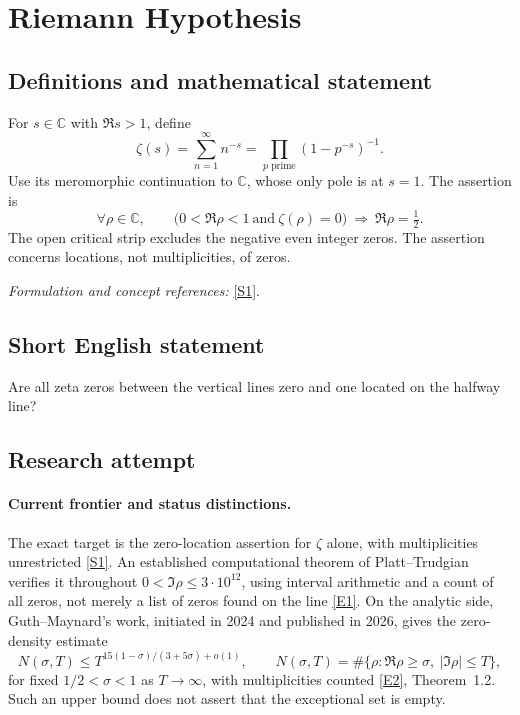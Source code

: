 \documentclass[11pt]{article}
\newcommand{\C}{\mathbb{C}}
\newcommand{\sref}[2]{\hyperlink{source:#1:#2}{[S#2]}}
\newcommand{\eref}[2]{\hyperlink{extra:#1:#2}{[E#2]}}
\newif\ifshowcatalogue
\newcommand{\cataloguescope}[1]{\ifshowcatalogue
 \paragraph{Exact scope in the supplied catalogue.}
 \begin{quote}\small #1\end{quote}\fi}
\begin{document}
\setcounter{section}{1}
\clearpage
\section{\texorpdfstring{Riemann Hypothesis}{Riemann Hypothesis}}\label{2}
\subsection{Definitions and mathematical statement}
For $s\in\C$ with $\Re s>1$, define
\[
 \zeta(s)=\sum_{n=1}^{\infty}n^{-s}=\prod_{p\text{ prime}}(1-p^{-s})^{-1}.
\]
Use its meromorphic continuation to $\C$, whose only pole is at $s=1$. The assertion is
\[
 \forall\rho\in\C,\qquad \bigl(0<\Re\rho<1\ \text{and}\ \zeta(\rho)=0\bigr)
 \ \Longrightarrow\ \Re\rho=\tfrac12.
\]
The open critical strip excludes the negative even integer zeros. The assertion concerns locations, not multiplicities, of zeros.
\par\smallskip\textit{Formulation and concept references:} \sref{2}{1}.
\cataloguescope{For the meromorphic continuation of the Riemann zeta function zeta(s)=sum\_\{n>=1\} n\textasciicircum{}(-s), initially defined for Re(s)>1, every zero s in the open critical strip 0<Re(s)<1 has Re(s)=1/2. This is the Riemann Hypothesis for zeta alone; it does not assert simplicity of its zeros.}
\subsection{Short English statement}
Are all zeta zeros between the vertical lines zero and one located on the halfway line?
\subsection{Research attempt}

\paragraph{Current frontier and status distinctions.}
The exact target is the zero-location assertion for $\zeta$ alone, with
multiplicities unrestricted \sref{2}{1}. An established computational theorem
of Platt--Trudgian verifies it throughout $0<\Im\rho\le 3\cdot10^{12}$,
using interval arithmetic and a count of all zeros, not merely a list of zeros
found on the line \eref{2}{1}. On the analytic side, Guth--Maynard's work,
initiated in 2024 and published in 2026, gives the zero-density estimate
\[
 N(\sigma,T)\le T^{15(1-\sigma)/(3+5\sigma)+o(1)},
 \qquad N(\sigma,T)=\#\{\rho:\Re\rho\ge\sigma,\ |\Im\rho|\le T\},
\]
for fixed $1/2<\sigma<1$ as $T\to\infty$, with multiplicities counted
\eref{2}{2}, Theorem~1.2. Such an upper bound does
not assert that the exceptional set is empty.
\end{document}
